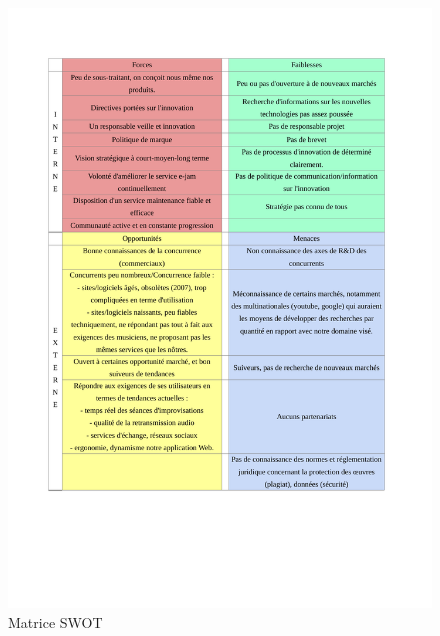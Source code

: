 \documentclass[a4,12pt]{article}
\begin{document}
\begin{figure}[H]
    \centering
    \includegraphics[scale=0.7]{SWOT.pdf}
    \caption{Matrice SWOT}
    \label{fig:SWOT}
\end{figure}
\end{document}
